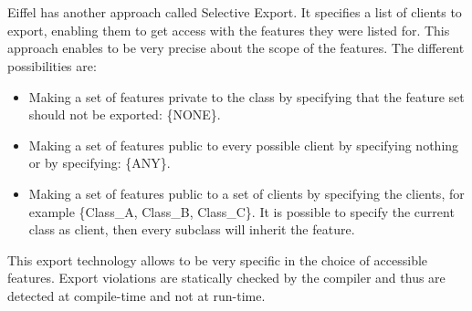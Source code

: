 \documentclass[12pt,a4paper,twocolumn]{article}
\begin{document}
\\
\\
Eiffel has another approach called Selective Export. It specifies a list of clients to export, enabling them to get access with the features they were listed for. This approach enables to be very precise about the scope of the features. The different possibilities are:
\begin{itemize}
\item Making a set of features private to the class by specifying that the feature set should not be exported: \{NONE\}.
\item Making a set of features public to every possible client by specifying nothing or by specifying: \{ANY\}.
\item Making a set of features public to a set of clients by specifying the clients, for example \{Class\_A, Class\_B, Class\_C\}. It is possible to specify the current class as client, then every subclass will inherit the feature.
\end{itemize}
This export technology allows to be very specific in the choice of accessible features. Export violations are statically checked by the compiler and thus are detected at compile-time and not at run-time.
\end{document}
